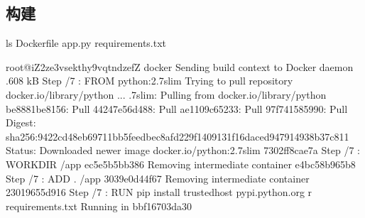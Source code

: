 \documentclass[letterpaper,10pt,english]{sphinxmanual}
\begin{document}
\subsection{构建}
\label{\detokenize{_u5feb_u901f_u5165_u95e8/02-_u5bb9_u5668:id5}}
%
\begin{sphinxVerbatim}[commandchars=\\\{\}]
\PYGZdl{} ls
Dockerfile          app.py                  requirements.txt

\PYG{o}{[}root@iZ2ze3vsekthy9vqtndzefZ docker\PYG{o}{]}
Sending build context to Docker daemon .608 kB
Step /7 : FROM python:2.7\PYGZhy{}slim
Trying to pull repository docker.io/library/python ...
.7\PYGZhy{}slim: Pulling from docker.io/library/python
be8881be8156: Pull 
44247e56d488: Pull 
ae1109c65233: Pull 
97f741585990: Pull 
Digest: sha256:9422cd48eb69711bb5feedbec8afd229f1409131f16daced947914938b37c811
Status: Downloaded newer image  docker.io/python:2.7\PYGZhy{}slim
\PYGZhy{}\PYGZhy{}\PYGZhy{}\PYGZgt{} 7302ff8cae7a
Step /7 : WORKDIR /app
\PYGZhy{}\PYGZhy{}\PYGZhy{}\PYGZgt{} ec5e5b5bb386
Removing intermediate container e4bc58b965b8
Step /7 : ADD . /app
\PYGZhy{}\PYGZhy{}\PYGZhy{}\PYGZgt{} 3039e0d44f67
Removing intermediate container 23019655d916
Step /7 : RUN pip install \PYGZhy{}\PYGZhy{}trusted\PYGZhy{}host pypi.python.org \PYGZhy{}r requirements.txt
\PYGZhy{}\PYGZhy{}\PYGZhy{}\PYGZgt{} Running in bbf16703da30


\end{sphinxVerbatim}
\end{document}
